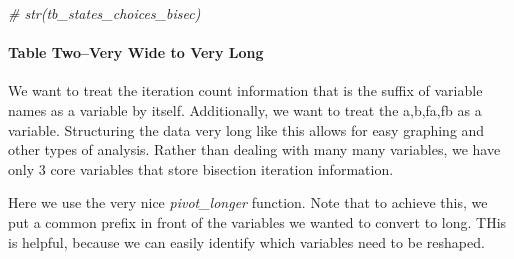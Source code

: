 \documentclass[
]{book}
\newenvironment{Shaded}{\begin{snugshade}}{\end{snugshade}}
\newcommand{\CommentTok}[1]{\textcolor[rgb]{0.56,0.35,0.01}{\textit{#1}}}
\newcommand{\DataTypeTok}[1]{\textcolor[rgb]{0.13,0.29,0.53}{#1}}
\newcommand{\DecValTok}[1]{\textcolor[rgb]{0.00,0.00,0.81}{#1}}
\newcommand{\KeywordTok}[1]{\textcolor[rgb]{0.13,0.29,0.53}{\textbf{#1}}}
\newcommand{\NormalTok}[1]{#1}
\newcommand{\OperatorTok}[1]{\textcolor[rgb]{0.81,0.36,0.00}{\textbf{#1}}}
\newcommand{\StringTok}[1]{\textcolor[rgb]{0.31,0.60,0.02}{#1}}
\begin{document}
\begin{Shaded}
\begin{Highlighting}[]
\CommentTok{# str(tb_states_choices_bisec)}
\end{Highlighting}
\end{Shaded}

\hypertarget{table-twovery-wide-to-very-long}{%
\paragraph{Table Two--Very Wide to Very Long}\label{table-twovery-wide-to-very-long}}

We want to treat the iteration count information that is the suffix of variable names as a variable by itself. Additionally, we want to treat the a,b,fa,fb as a variable. Structuring the data very long like this allows for easy graphing and other types of analysis. Rather than dealing with many many variables, we have only 3 core variables that store bisection iteration information.

Here we use the very nice \emph{pivot\_longer} function. Note that to achieve this, we put a common prefix in front of the variables we wanted to convert to long. THis is helpful, because we can easily identify which variables need to be reshaped.

\begin{Shaded}
\end{Shaded}
\end{document}
